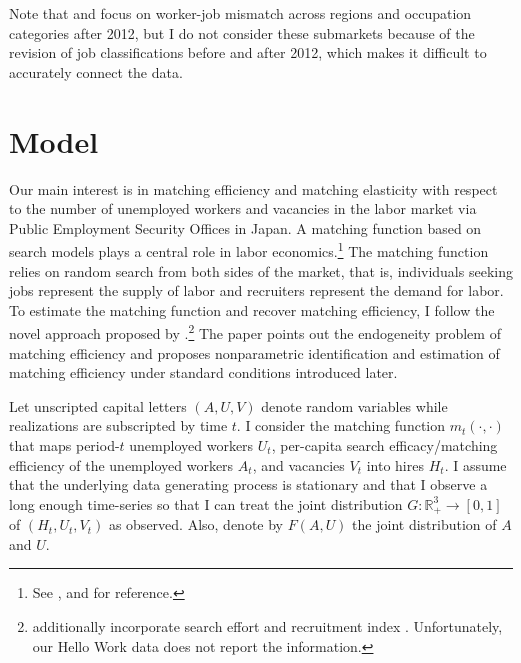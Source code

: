 \documentclass[12pt]{article}
\begin{document}
Note that \cite{kawata2019} and \cite{higashi2018spatial} focus on worker-job mismatch across regions and occupation categories after 2012, but I do not consider these submarkets because of the revision of job classifications before and after 2012, which makes it difficult to accurately connect the data.




\section{Model}
Our main interest is in matching efficiency and matching elasticity with respect to the number of unemployed workers and vacancies in the labor market via Public Employment Security Offices in Japan.
A matching function based on search models plays a central role in labor economics.\footnote{See \cite{pissarides2000equilibrium,petrongolo2001looking}, and \cite{rogerson2005search} for reference.} 
The matching function relies on random search from both sides of the market, that is, individuals seeking jobs represent the supply of labor and recruiters represent the demand for labor.
To estimate the matching function and recover matching efficiency, I follow the novel approach proposed by \cite{lange2020beyond}.\footnote{\cite{lange2020beyond} additionally incorporate search effort \citep{mukoyama2018job} and recruitment index \citep{davis2013establishment}. Unfortunately, our Hello Work data does not report the information.}
The paper points out the endogeneity problem of matching efficiency \citep{borowczyk2013accounting} and proposes nonparametric identification and estimation of matching efficiency under standard conditions introduced later.

Let unscripted capital letters $(A, U, V)$ denote random variables while realizations are subscripted by time $t$. 
I consider the matching function $m_t(\cdot,\cdot)$ that maps period-$t$ unemployed workers $U_t$, per-capita search efficacy/matching efficiency of the unemployed workers $A_t$, and vacancies $V_t$ into hires $H_t$.
I assume that the underlying data generating process is stationary and that I observe a long enough time-series so that I can treat the joint distribution $G: \mathbb{R}_{+}^3 \rightarrow[0,1]$ of $\left(H_t, U_t, V_t\right)$ as observed. 
Also, denote by $F(A, U)$ the joint distribution of $A$ and $U$.
\end{document}
